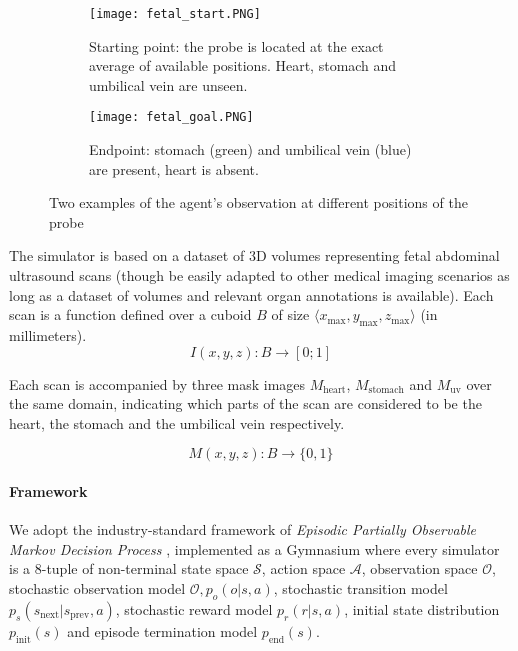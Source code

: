 \begin{figure}
    \centering
    \begin{subfigure}{.45\linewidth}
      \centering
      \texttt{[image: fetal\_start.PNG]}
      \caption{Starting point: the probe is located at the exact average of available positions. Heart, stomach and umbilical vein are unseen.}
      \label{fig:img-before}
    \end{subfigure}%
    \begin{subfigure}{.45\linewidth}
      \centering
      \texttt{[image: fetal\_goal.PNG]}
      \caption{Endpoint: stomach (green) and umbilical vein (blue) are present, heart is absent.}
      \label{fig:img-after}
    \end{subfigure}
    \caption{Two examples of the agent's observation at different positions of the probe}
    \label{fig:imgs}
\end{figure}

The simulator is based on a dataset of 3D volumes representing fetal abdominal ultrasound scans (though be easily adapted to other medical imaging scenarios as long as a dataset of volumes and relevant organ annotations is available).
Each scan is a function defined over a cuboid $B$ of size $\langle x_\text{max},y_\text{max},z_\text{max} \rangle$ (in millimeters).
\begin{equation}
    I(x,y,z): B \rightarrow [0;1]
\end{equation}

Each scan is accompanied by three mask images $M_\text{heart}$, $M_\text{stomach}$ and $M_\text{uv}$ over the same domain, indicating which parts of the scan are considered to be the heart, the stomach and the umbilical vein respectively.

\begin{equation}
    M(x,y,z): B \rightarrow \{0,1\}
\end{equation}

\paragraph{Framework}

We adopt the industry-standard framework of {\em Episodic Partially Observable Markov Decision Process} \cite{kramerjdavidrPartiallyObservableMarkov1964, spaanPartiallyObservableMarkov2012}, implemented as a Gymnasium \cite{towersGymnasiumStandardInterface2024} where every simulator is a 8-tuple of non-terminal state space $\mathcal{S}$, action space $\mathcal{A}$, observation space $\mathcal{O}$, stochastic observation model $\mathcal{O}, p_o(o | s, a)$, stochastic transition model $p_s(s_\text{next} | s_\text{prev}, a)$, stochastic reward model $p_r(r | s, a)$, initial state distribution $p_\text{init}(s)$ and episode termination model $p_\text{end}(s)$.

